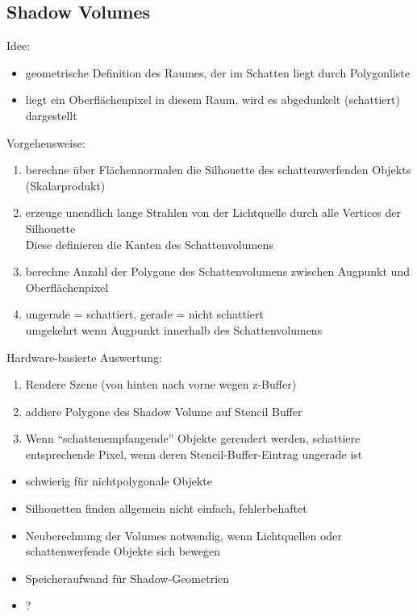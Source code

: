 \documentclass[a4paper, 12pt]{article}
\begin{document}
\subsection{Shadow Volumes}
Idee:
\begin{itemize}
  \item geometrische Definition des Raumes, der im Schatten liegt durch Polygonliste
  \item liegt ein Oberflächenpixel in diesem Raum, wird es abgedunkelt (schattiert) dargestellt
\end{itemize}
Vorgehensweise:
\begin{enumerate}
  \item berechne über Flächennormalen die Silhouette des schattenwerfenden Objekts (Skalarprodukt)
  \item erzeuge unendlich lange Strahlen von der Lichtquelle durch alle Vertices der Silhouette\\
    Diese definieren die Kanten des Schattenvolumens
  \item berechne Anzahl der Polygone des Schattenvolumens zwischen Augpunkt und Oberflächenpixel
  \item ungerade = schattiert, gerade = nicht schattiert\\
    umgekehrt wenn Augpunkt innerhalb des Schattenvolumens
\end{enumerate}
Hardware-basierte Auswertung:
\begin{enumerate}
  \item Rendere Szene (von hinten nach vorne wegen z-Buffer)
  \item addiere Polygone des Shadow Volume auf Stencil Buffer
  \item Wenn ``schattenempfangende'' Objekte gerendert werden, schattiere entsprechende Pixel, wenn deren Stencil-Buffer-Eintrag ungerade ist
\end{enumerate}
\begin{itemize}
  \renewcommand{\labelitemi}{\(-\)}%
  \item schwierig für nichtpolygonale Objekte
  \item Silhouetten finden allgemein nicht einfach, fehlerbehaftet
  \item Neuberechnung der Volumes notwendig, wenn Lichtquellen oder schattenwerfende Objekte sich bewegen
  \item Speicheraufwand für Shadow-Geometrien
\end{itemize}
\begin{itemize}
  \renewcommand{\labelitemi}{+}%
  \item ?
\end{itemize}
\end{document}
